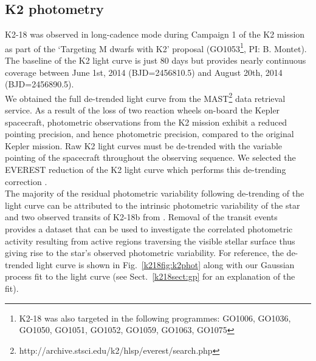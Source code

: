 \subsection{K2 photometry}
K2-18 was observed in long-cadence mode during Campaign 1 of the
K2 mission as part of the `Targeting M dwarfs with K2' proposal
(GO1053\footnote{K2-18 was also targeted in the following programmes:
  GO1006, GO1036, GO1050, GO1051, GO1052, GO1059, GO1063, GO1075}, PI: B. Montet).
The baseline of the K2 light curve is just 80 days but provides nearly continuous
coverage between June 1st, 2014 (BJD=2456810.5) and August 20th, 2014 (BJD=2456890.5).  \\

We obtained the full de-trended light curve from the
MAST\footnote{http://archive.stsci.edu/k2/hlsp/everest/search.php} data retrieval service. As a result
of the loss of two reaction wheels on-board the Kepler spacecraft, photometric
observations from the K2 mission exhibit a reduced pointing precision, and
hence photometric precision, compared to the original Kepler mission. Raw K2
light curves must be de-trended with the variable pointing of the
spacecraft throughout the observing sequence. We selected the EVEREST reduction of
the K2 light curve which performs this de-trending correction \citep{luger16}. \\

The majority of the residual photometric variability following de-trending of
the light curve can be attributed to the intrinsic photometric variability of
the star and two observed transits of K2-18b from \cite{montet15}. Removal
of the transit events provides a dataset that can be used to investigate the
correlated photometric activity resulting from active regions
traversing the visible stellar surface thus giving rise to the star's observed
photometric variability. For reference, the de-trended light curve
is shown in Fig.~\ref{k218fig:k2phot} along with our Gaussian process fit to the
light curve (see Sect.~\ref{k218sect:gp} for an explanation of the fit).

